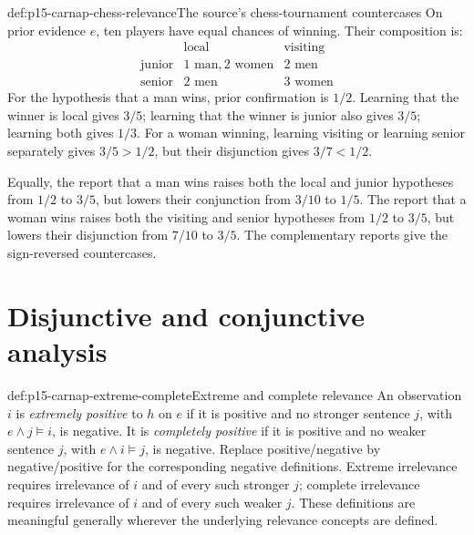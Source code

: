 \begin{hbexample}{def:p15-carnap-chess-relevance}{The source's chess-tournament countercases}
On prior evidence \(e\), ten players have equal chances of winning.
Their composition is:
\[
\begin{array}{c|cc}
 &\text{local}&\text{visiting}\\\hline
 \text{junior}&1\text{ man},2\text{ women}&2\text{ men}\\
 \text{senior}&2\text{ men}&3\text{ women}
\end{array}
\]
For the hypothesis that a man wins, prior confirmation is \(1/2\).
Learning that the winner is local gives \(3/5\); learning that the
winner is junior also gives \(3/5\); learning both gives \(1/3\).
For a woman winning, learning visiting or learning senior separately
gives \(3/5>1/2\), but their disjunction gives \(3/7<1/2\).

Equally, the report that a man wins raises both the local and junior
hypotheses from \(1/2\) to \(3/5\), but lowers their conjunction
from \(3/10\) to \(1/5\). The report that a woman wins raises both
the visiting and senior hypotheses from \(1/2\) to \(3/5\), but
lowers their disjunction from \(7/10\) to \(3/5\).
The complementary reports give the sign-reversed countercases.
\end{hbexample}

\section{Disjunctive and conjunctive analysis}
\label{sec:p15-carnap-relevance-analysis}

\begin{hbdefinition}{def:p15-carnap-extreme-complete}{Extreme and complete relevance}
An observation \(i\) is \emph{extremely positive} to \(h\) on
\(e\) if it is positive and no stronger sentence \(j\), with
\(e\land j\models i\), is negative. It is \emph{completely
positive} if it is positive and no weaker sentence \(j\), with
\(e\land i\models j\), is negative. Replace positive/negative
by negative/positive for the corresponding negative definitions.
Extreme irrelevance requires irrelevance of \(i\) and of every such
stronger \(j\); complete irrelevance requires irrelevance of \(i\)
and of every such weaker \(j\). These definitions are meaningful
generally wherever the underlying relevance concepts are defined.
\end{hbdefinition}

